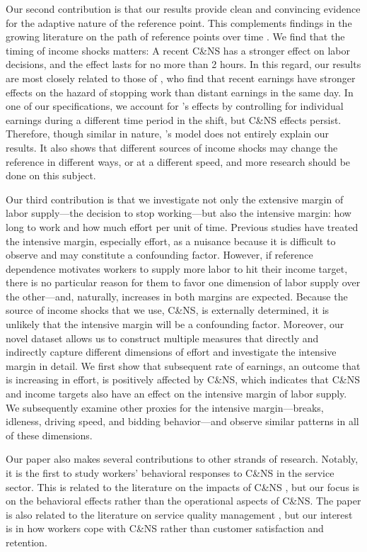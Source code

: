 \documentclass[reviewmode]{restat}
\begin{document}
Our second contribution is that our results provide clean and convincing evidence for the adaptive nature
of the reference point. This complements findings in the growing literature on the path of reference points
over time \citep{dellavigna2017reference,thakral2018daily}. We find that the timing of income shocks matters:
A recent C\&NS has a stronger effect on labor decisions, and the effect lasts for no more than 2 hours. 
In this regard, our results are most closely related to those of \citet{thakral2018daily}, who find that 
recent earnings have stronger effects on the hazard of stopping work than distant earnings in the same day.
In one of our specifications, we account for \citeauthor{thakral2018daily}'s effects by controlling for
individual earnings during a different time period in the shift, but C\&NS effects persist. Therefore,
though similar in nature, \citeauthor{thakral2018daily}'s model does not entirely explain our results. 
It also shows that different sources of income shocks may change the reference in different ways, or at
a different speed, and more research should be done on this subject.

Our third contribution is that we investigate not only the extensive margin of labor supply---the decision
to stop working---but also the intensive margin: how long to work and how much effort per unit of time. 
Previous studies have treated the intensive margin, especially effort, as a nuisance because it is 
difficult to observe and may constitute a confounding factor. However, if reference dependence motivates
workers to supply more labor to hit their income target, there is no particular reason for them to favor
one dimension of labor supply over the other---and, naturally, increases in both margins are expected.
Because the source of income shocks that we use, C\&NS, is externally determined, it is unlikely that the 
intensive margin will be a confounding factor. Moreover, our novel dataset allows us to construct multiple
measures that directly and indirectly capture different dimensions of effort and investigate the intensive
margin in detail. We first show that subsequent rate of earnings, an outcome that is increasing in effort,
is positively affected by C\&NS, which indicates that C\&NS and income targets also have an effect on the
intensive margin of labor supply. We subsequently examine other proxies for the intensive margin---breaks,
idleness, driving speed, and bidding behavior---and observe similar patterns in all of these dimensions.

Our paper also makes several contributions to other strands of research. Notably, it is the first to study
workers' behavioral responses to C\&NS in the service sector. This is related to the literature on the
impacts of C\&NS \citep{moore2001time,patrick2008reducing,norris2014empirical,feldman2014appointment}, 
but our focus is on the behavioral effects rather than the operational aspects of C\&NS. 
The paper is also related to the literature on service quality management \citep{cohen2018frustration},
but our interest is in how workers cope with C\&NS rather than customer satisfaction and retention. 
\end{document}
